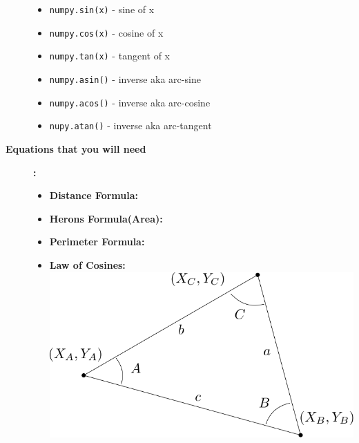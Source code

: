 \documentclass[12pt]{article}
\begin{document}
\begin{description}
    \begin{itemize}             
        
        \item \lstinline{numpy.sin(x)} - sine of x
        \item \lstinline{numpy.cos(x)} - cosine of x
        \item \lstinline{numpy.tan(x)} - tangent of x
        
        \item \lstinline{numpy.asin()} - inverse aka arc-sine  
        \item \lstinline{numpy.acos()} - inverse aka arc-cosine
        \item \lstinline{nupy.atan()} - inverse aka arc-tangent
        
    \end{itemize}    

 \vspace{20mm}

 \newpage
\item [\textbf{Equations that you will need }]\textbf{:} \\
    \begin{itemize}             
        
        \item {\bf Distance Formula:}  \\
        
        \item {\bf Herons Formula(Area):}  \vspace{2mm}\\
        \item {\bf Perimeter Formula:}  \vspace{2mm}\\
        \item {\bf Law of Cosines:} \includegraphics[scale=.5]{hw2_fig1.png} \\
        

\end{itemize}
\end{description}
\end{document}
